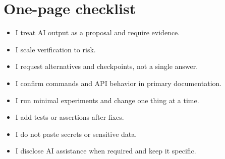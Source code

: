 \section{One-page checklist}
\begin{itemize}[noitemsep]
  \item I treat AI output as a proposal and require evidence.
  \item I scale verification to risk.
  \item I request alternatives and checkpoints, not a single answer.
  \item I confirm commands and API behavior in primary documentation.
  \item I run minimal experiments and change one thing at a time.
  \item I add tests or assertions after fixes.
  \item I do not paste secrets or sensitive data.
  \item I disclose AI assistance when required and keep it specific.
\end{itemize}

